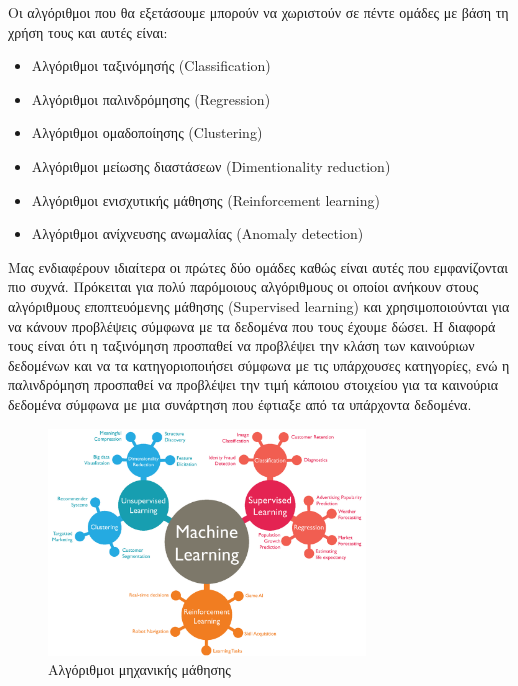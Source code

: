 Οι αλγόριθμοι που θα εξετάσουμε μπορούν να χωριστούν σε πέντε
ομάδες με βάση τη χρήση τους και αυτές είναι:
\begin{itemize}
    \item Αλγόριθμοι ταξινόμησής (\textlatin{Classification})
    \item Αλγόριθμοι παλινδρόμησης (\textlatin{Regression})
    \item Αλγόριθμοι ομαδοποίησης (\textlatin{Clustering})
    \item Αλγόριθμοι μείωσης διαστάσεων (\textlatin{Dimentionality reduction})
    \item Αλγόριθμοι ενισχυτικής μάθησης (\textlatin{Reinforcement learning})
    \item Αλγόριθμοι ανίχνευσης ανωμαλίας (\textlatin{Anomaly detection})
\end{itemize}
Μας ενδιαφέρουν ιδιαίτερα οι πρώτες δύο ομάδες
καθώς είναι αυτές που
εμφανίζονται πιο συχνά. Πρόκειται για πολύ παρόμοιους
αλγόριθμους οι οποίοι ανήκουν στους αλγόριθμους εποπτευόμενης
μάθησης (\textlatin{Supervised learning}) και χρησιμοποιούνται
για να κάνουν προβλέψεις σύμφωνα με τα δεδομένα
που τους έχουμε
δώσει. Η διαφορά τους είναι ότι η ταξινόμηση προσπαθεί να 
προβλέψει την κλάση των καινούριων δεδομένων και να τα 
κατηγοριοποιήσει σύμφωνα με τις υπάρχουσες κατηγορίες, ενώ η 
παλινδρόμηση προσπαθεί να προβλέψει την τιμή κάποιου στοιχείου 
για τα καινούρια δεδομένα σύμφωνα με μια συνάρτηση που
έφτιαξε
από τα υπάρχοντα δεδομένα.
\begin{figure}[H]
    \centering
    \includegraphics[width=0.75\textwidth]{images/machineLearning.png}
    \caption{Αλγόριθμοι μηχανικής μάθησης}
\end{figure}